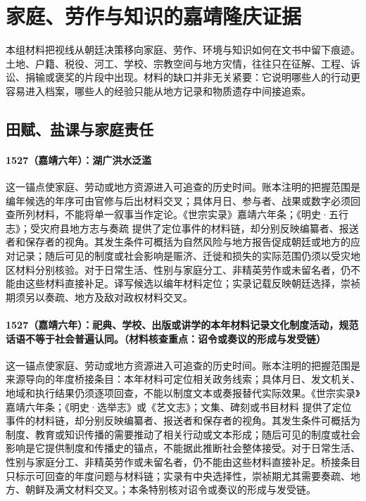 \section{家庭、劳作与知识的嘉靖隆庆证据}

本组材料把视线从朝廷决策移向家庭、劳作、环境与知识如何在文书中留下痕迹。土地、户籍、税役、河工、学校、宗教空间与地方灾情，往往只在征解、工程、诉讼、捐输或褒奖的片段中出现。材料的缺口并非无关紧要：它说明哪些人的行动更容易进入档案，哪些人的经验只能从地方记录和物质遗存中间接追索。

\subsection{田赋、盐课与家庭责任}

\paragraph{1527（嘉靖六年）：湖广洪水泛滥} 这一锚点使家庭、劳动或地方资源进入可追查的历史时间。账本注明的把握范围是编年候选的年序可由官修与后出材料交叉；具体月日、参与者、战果或数字必须回查所列材料，不能将单一叙事当作定论。《世宗实录》嘉靖六年条；《明史·五行志》；受灾府县地方志与奏疏 提供了定位事件的材料链，却分别反映编纂者、报送者和保存者的视角。其发生条件可概括为自然风险与地方报告促成朝廷或地方的应对记录；随后可见的制度或社会影响是赈济、迁徙和损失的实际范围仍须以受灾地区材料分别核验。对于日常生活、性别与家庭分工、非精英劳作或未留名者，仍不能由这些材料直接补足。译写候选以编年材料定位；实录记载反映朝廷选择，崇祯期须另以奏疏、地方及敌对政权材料交叉。

\paragraph{1527（嘉靖六年）：祀典、学校、出版或讲学的本年材料记录文化制度活动，规范话语不等于社会普遍认同。（材料核查重点：诏令或奏议的形成与发受链）} 这一锚点使家庭、劳动或地方资源进入可追查的历史时间。账本注明的把握范围是来源导向的年度桥接条目：本年材料可定位相关政务线索；具体月日、发文机关、地域和执行结果仍须逐项回查，不能以制度文本或奏报替代实际效果。《世宗实录》嘉靖六年条；《明史·选举志》或《艺文志》；文集、碑刻或书目材料 提供了定位事件的材料链，却分别反映编纂者、报送者和保存者的视角。其发生条件可概括为制度、教育或知识传播的需要推动了相关行动或文本形成；随后可见的制度或社会影响是它提供制度和传播史的锚点，不能据此推断社会整体接受。对于日常生活、性别与家庭分工、非精英劳作或未留名者，仍不能由这些材料直接补足。桥接条目只标示可回查的年度问题与材料链；实录有中央选择性，崇祯期尤其需要奏疏、地方、朝鲜及满文材料交叉。；本条特别核对诏令或奏议的形成与发受链。

